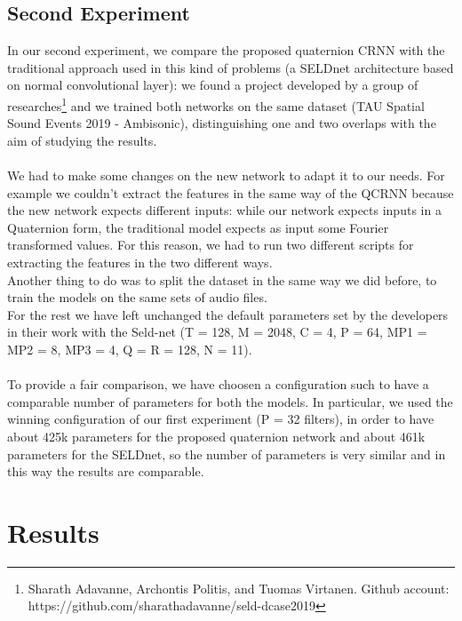 \documentclass{article}
\begin{document}
    \subsection*{Second Experiment}
    In our second experiment, we compare the proposed quaternion CRNN with the traditional approach used in this kind of problems (a SELDnet architecture based on normal convolutional layer): we found a project developed by a group of researches\footnote{ Sharath Adavanne, Archontis Politis, and Tuomas Virtanen. Github account: https://github.com/sharathadavanne/seld-dcase2019} and we trained both networks on the same dataset (TAU Spatial Sound Events 2019 - Ambisonic), distinguishing one and two overlaps with the aim of studying the results.\\
    \\
    We had to make some changes on the new network to adapt it to our needs. For example we couldn't extract the features in the same way of the QCRNN because the new network expects different inputs: while our network expects inputs in a Quaternion form, the traditional model expects as input some Fourier transformed values. For this reason, we had to run two different scripts for extracting the features in the two different ways. \\
    Another thing to do was to split the dataset in the same way we did before, to train the models on the same sets of audio files.\\
	For the rest we have left unchanged the default parameters set by the developers in their work with the Seld-net (T = 128, M = 2048, C = 4, P = 64, MP1 = MP2 = 8, MP3 = 4, Q = R = 128, N = 11).\\
	\\
	To provide a fair comparison, we have choosen a configuration such to have a comparable number of parameters for both the models. In particular, we used the winning configuration of our first experiment (P = 32 filters), in order to have about 425k parameters for the proposed quaternion network and about 461k parameters for the SELDnet, so the number of parameters is very similar and in this way the results are comparable. \\
    \section{Results}
\end{document}
